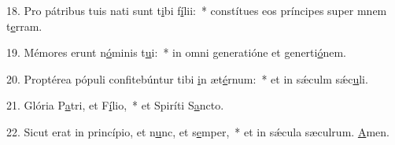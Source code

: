 18. Pro pátribus tuis nati sunt t\uline{i}bi f\uline{í}lii:~* constítues eos príncipes super mnem t\uline{e}rram.\par 
19. Mémores erunt n\uline{ó}minis t\uline{u}i:~* in omni generatióne et generti\uline{ó}nem.\par 
20. Proptérea pópuli confitebúntur tibi \uline{i}n æt\uline{é}rnum:~* et in sǽculm sǽc\uline{u}li.\par 
21. Glória P\uline{a}tri, et F\uline{í}lio,~* et Spiríti S\uline{a}ncto.\par 
22. Sicut erat in princípio, et n\uline{u}nc, et s\uline{e}mper,~* et in sǽcula sæculrum. \uline{A}men.\par 
